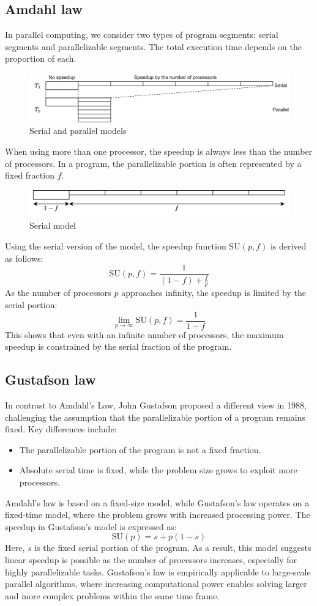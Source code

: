 \subsection{Amdahl law}
In parallel computing, we consider two types of program segments: serial segments and parallelizable segments. 
The total execution time depends on the proportion of each.
\begin{figure}[H]
    \centering
    \includegraphics[width=0.8\linewidth]{images/am.png}
    \caption{Serial and parallel models}
\end{figure}
When using more than one processor, the speedup is always less than the number of processors. 
In a program, the parallelizable portion is often represented by a fixed fraction $f$. 
\begin{figure}[H]
    \centering
    \includegraphics[width=0.8\linewidth]{images/am1.png}
    \caption{Serial model}
\end{figure}
Using the serial version of the model, the speedup function $\text{SU}(p,f)$ is derived as follows:
\[\text{SU}(p,f)=\dfrac{1}{(1-f)+\frac{f}{p}}\]
As the number of processors $p$ approaches infinity, the speedup is limited by the serial portion:
\[\lim_{p\rightarrow\infty}\text{SU}(p,f)=\dfrac{1}{1-f}\]
This shows that even with an infinite number of processors, the maximum speedup is constrained by the serial fraction of the program. 

\subsection{Gustafson law}
In contrast to Amdahl's Law, John Gustafson proposed a different view in 1988, challenging the assumption that the parallelizable portion of a program remains fixed. 
Key differences include:
\begin{itemize}
    \item The parallelizable portion of the program is not a fixed fraction.
    \item Absolute serial time is fixed, while the problem size grows to exploit more processors.
\end{itemize}
Amdahl's law is based on a fixed-size model, while Gustafson's law operates on a fixed-time model, where the problem grows with increased processing power.
The speedup in Gustafson's model is expressed as:
\[\text{SU}(p)=s+p(1-s)\]
Here, $s$ is the fixed serial portion of the program.
As a result, this model suggests linear speedup is possible as the number of processors increases, especially for highly parallelizable tasks. 
Gustafson's law is empirically applicable to large-scale parallel algorithms, where increasing computational power enables solving larger and more complex problems within the same time frame.